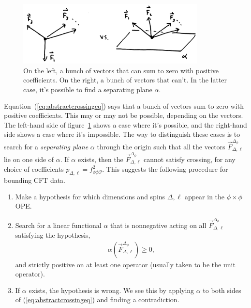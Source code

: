 \documentclass{ws-rv9x6}
\newcommand\be{\begin{eqnarray}}
\newcommand\ee{\end{eqnarray}}
\newcommand\f\phi
\newcommand\cO{\mathcal{O}}
\newcommand\<\langle
\renewcommand\>\rangle
\renewcommand\.{\cdot}
\newcommand\x\times
\newcommand\De{\Delta}
\renewcommand\a\alpha
\begin{document}
\begin{figure}
\begin{center}
\includegraphics[width=0.85\textwidth]{vectorpossibilities.jpg}
\end{center}
\caption{On the left, a bunch of vectors that can sum to zero with positive coefficients.  On the right, a bunch of vectors that can't.  In the latter case, it's possible to find a separating plane $\a$.\label{fig:vectorpossibilities}}
\end{figure}

Equation~(\ref{eq:abstractcrossingeq}) says that a bunch of vectors sum to zero with positive coefficients.  This may or may not be possible, depending on the vectors.  The left-hand side of figure~\ref{fig:vectorpossibilities} shows a case where it's possible, and the right-hand side shows a case where it's impossible.  The way to distinguish these cases is to search for a {\it separating plane} $\alpha$ through the origin such that all the vectors $\vec{F}_{\De,\ell}^{\De_\f}$ lie on one side of $\alpha$.  If $\alpha$ exists, then the  $\vec{F}_{\De,\ell}^{\De_\f}$ cannot satisfy crossing, for any choice of coefficients $p_{\De,\ell}=f_{\f\f\cO}^2$.  This suggests the following procedure for bounding CFT data.

\begin{algorithm}
\label{thealgorithm}
\qquad

\begin{enumerate}
\item Make a hypothesis for which dimensions and spins $\De,\ell$ appear in the $\f\x\f$ OPE.
\item Search for a linear functional $\alpha$ that is nonnegative acting on all $\vec F_{\Delta,\ell}^{\Delta_\f}$ satisfying the hypothesis,
\be
\alpha(\vec F_{\Delta,\ell}^{\De_\f})\geq 0,
\ee
and strictly positive on at least one operator (usually taken to be the unit operator).
\item If $\alpha$ exists, the hypothesis is wrong.  We see this by applying $\alpha$ to both sides of (\ref{eq:abstractcrossingeq}) and finding a contradiction.
\end{enumerate}
\end{algorithm}
\end{document}
